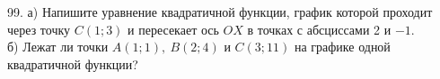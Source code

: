 99. а) Напишите уравнение квадратичной функции, график которой проходит через точку $C(1;3)$ и пересекает ось $OX$ в точках с абсциссами 2 и $-1.$\\
б) Лежат ли точки $A(1;1),\ B(2;4)$ и $C(3;11)$ на графике одной квадратичной функции?\\
